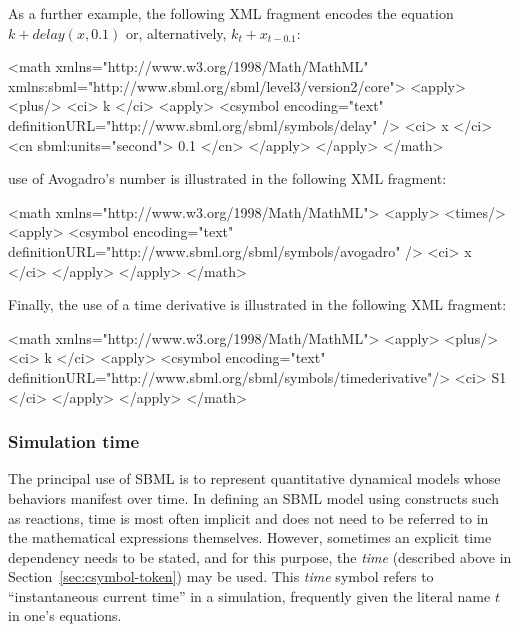 As a further example, the following XML fragment encodes the equation
$k + delay(x, 0.1)$ or, alternatively, $k_t + x_{t - 0.1}$:

\begin{example}
<math xmlns="http://www.w3.org/1998/Math/MathML"
      xmlns:sbml="http://www.sbml.org/sbml/level3/version2/core">
    <apply>
        <plus/>
        <ci> k </ci>
        <apply>
            <csymbol encoding="text" definitionURL="http://www.sbml.org/sbml/symbols/delay" />
            <ci> x </ci>
            <cn sbml:units="second"> 0.1 </cn>
        </apply>
    </apply>
</math>
\end{example}

 use of Avogadro's number is illustrated in the
following XML fragment:

\begin{example}
<math xmlns="http://www.w3.org/1998/Math/MathML">
    <apply>
        <times/>
        <apply>
            <csymbol encoding="text" definitionURL="http://www.sbml.org/sbml/symbols/avogadro" />
            <ci> x </ci>
        </apply>
    </apply>
</math>
\end{example}

\begin{blockChanged}
Finally, the use of a time derivative is illustrated in the
following XML fragment:

\begin{example}
<math xmlns="http://www.w3.org/1998/Math/MathML">
  <apply>
    <plus/>
    <ci> k </ci>
    <apply>
      <csymbol encoding="text" definitionURL="http://www.sbml.org/sbml/symbols/timederivative"/>
      <ci> S1 </ci>
    </apply>
  </apply>
</math>
\end{example}
\end{blockChanged}

\subsubsection{Simulation time}
\label{sec:meaning-of-time}

The principal use of SBML is to represent quantitative dynamical
models whose behaviors manifest over time.  In defining an
SBML model using constructs such as reactions, time is most often
implicit and does not need to be referred to in the mathematical
expressions themselves.  However, sometimes an explicit time
dependency needs to be stated, and for this purpose, the
\emph{time}  (described above in
Section~\ref{sec:csymbol-token}) may be used.  This \emph{time}
symbol refers to ``instantaneous current time'' in a simulation,
frequently given the literal name $t$ in one's equations.

